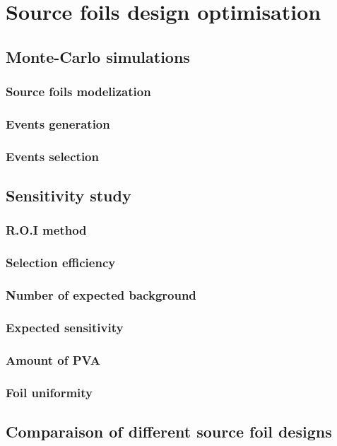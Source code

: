 \documentclass[main.tex]{subfiles}
\begin{document}
\chapter{Source foils design optimisation}


\section{Monte-Carlo simulations}
\subsection{Source foils modelization}
\subsection{Events generation}
\subsection{Events selection}

\section{Sensitivity study}
\subsection{R.O.I method}
\subsection{Selection efficiency}
\subsection{Number of expected background}
\subsection{Expected sensitivity}
\subsection{Amount of PVA}
\subsection{Foil uniformity}

\section{Comparaison  of different source foil designs}
\end{document}
